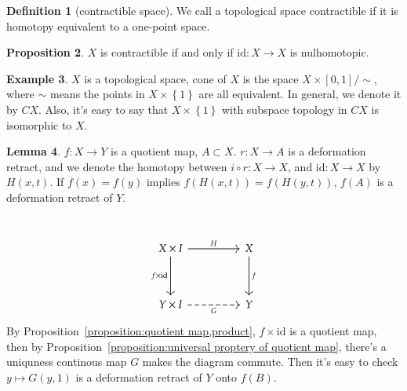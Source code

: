 \documentclass[12pt,a4paper]{book}
\newenvironment{prooff}{{\noindent\it\textcolor{cyan!40!black}{Proof}:}\,}{\par}
\newcommand{\bbrace}[1]{\left\{ #1 \right\} }
\theoremstyle{definition}
\newtheorem{defn}{Definition}[section]
\newtheorem{lem}[defn]{Lemma}
\newtheorem{prop}[defn]{Proposition}
\newtheorem{exam}[defn]{Example}
\begin{document}
\begin{defn}[contractible space]
    We call a topological space contractible if it is homotopy equivalent to a one-point space.
\end{defn}
\begin{prop}
    $X$ is contractible if and only if $\text{id}:X\rightarrow X$ is nulhomotopic.
\end{prop}
\begin{exam}
    $X$ is a topological space, cone of $X$ is the space $X\times [0,1]/\sim$, where $\sim$ means the points in $X\times \bbrace{1}$ are all equivalent.
    In general, we denote it by $CX$. Also,
    it's easy to say that $X\times \bbrace{1}$ with subspace topology in $CX$ is isomorphic to $X$.
\end{exam}
\begin{lem}
    $f:X\rightarrow Y$ is a quotient map, $A\subset X$. $r:X\rightarrow A$ is a deformation retract,
    and we denote the homotopy between $i\circ r:X\rightarrow X$,
    and $\text{id}:X\rightarrow X$ by $H(x,t)$.
    If $f(x)=f(y)$ implies $f(H(x,t))=f(H(y,t))$, $f(A)$ is a deformation retract of $Y$.
    \label{lemma:quotient,deformation retract}
\end{lem}
\begin{prooff}
    \[\begin{tikzcd}
            {X\times I} && X \\
            \\
            { Y\times I} && Y
            \arrow["H", from=1-1, to=1-3]
            \arrow["{f\times \text{id}}"', from=1-1, to=3-1]
            \arrow["f", from=1-3, to=3-3]
            \arrow["G"', dashed, from=3-1, to=3-3]
        \end{tikzcd}\]
    By Proposition~\ref{proposition:quotient map,product}, $f\times \text{id}$ is a quotient map, then by
    Proposition~\ref{proposition:universal proptery of quotient map}, there's a uniquness continous map $G$ makes the diagram commute.
    Then it's easy to check $y\mapsto G(y,1)$ is a deformation retract of $Y$ onto $f(B)$.
\end{prooff}
\end{document}
